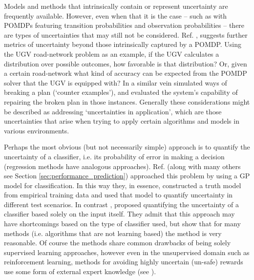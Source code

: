     Models and methods that intrinsically contain or represent uncertainty are frequently available. However, even when that it is the case -- such as with POMDPs featuring transition probabilities and observation probabilities -- there are types of uncertainties that may still not be considered. Ref. \citet{Aitken2016-fb}, suggests further metrics of uncertainty beyond those intrinsically captured by a POMDP. Using the UGV road-network problem as an example, if the UGV calculates a distribution over possible outcomes, how favorable is that distribution? Or, given a certain road-network what kind of accuracy can be expected from the POMDP solver that the UGV is equipped with? In a similar vein \cite{Kuter2012-bv} simulated ways of breaking a plan (`counter examples'), and evaluated the system's capability of repairing the broken plan in those instances. Generally these considerations might be described as addressing `uncertainties in application', which are those uncertainties that arise when trying to apply certain algorithms and models in various environments.

    Perhaps the most obvious (but not necessarily simple) approach is to quantify the uncertainty of a classifier, i.e. its probability of error in making a decision (regression methods have analogous approaches). Ref. \citet{Gurau2016-hs} (along with many others see Section \ref{sec:performance_prediction}) approached this problem by using a GP model for classification. In this way they, in essence, constructed a truth model from empirical training data and used that model to quantify uncertainty in different test scenarios. In contrast , \cite{Zhang2014-he} proposed quantifying the uncertainty of a classifier based solely on the input itself. They admit that this approach may have shortcomings based on the type of classifier used, but show that for many methods (i.e. algorithms that are not learning based) the method is very reasonable. Of course the methods share common drawbacks of being solely supervised learning approaches, however even in the unsupervised domain such as reinforcement learning, methods for avoiding highly uncertain (un-safe) rewards use some form of external expert knowledge (see \cite{Garcia2015-rs, Lipton2016-dq}). 


